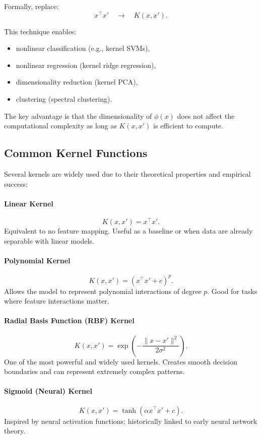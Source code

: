 \documentclass[12pt,a4paper]{report}
\begin{document}
Formally, replace:
\[
x^\top x' \quad \longrightarrow \quad K(x, x').
\]

This technique enables:
\begin{itemize}
  \item nonlinear classification (e.g., kernel SVMs),
  \item nonlinear regression (kernel ridge regression),
  \item dimensionality reduction (kernel PCA),
  \item clustering (spectral clustering).
\end{itemize}

The key advantage is that the dimensionality of $\phi(x)$ does not affect the computational complexity as long as $K(x, x')$ is efficient to compute.

\vspace{1em}
\subsection{Common Kernel Functions}

Several kernels are widely used due to their theoretical properties and empirical success:

\paragraph{Linear Kernel}
\[
K(x, x') = x^\top x'.
\]
Equivalent to no feature mapping. Useful as a baseline or when data are already separable with linear models.

\paragraph{Polynomial Kernel}
\[
K(x, x') = (x^\top x' + c)^p.
\]
Allows the model to represent polynomial interactions of degree $p$.  
Good for tasks where feature interactions matter.

\paragraph{Radial Basis Function (RBF) Kernel}
\[
K(x, x') = \exp\!\left( -\frac{\|x - x'\|^2}{2\sigma^2} \right).
\]
One of the most powerful and widely used kernels.  
Creates smooth decision boundaries and can represent extremely complex patterns.

\paragraph{Sigmoid (Neural) Kernel}
\[
K(x, x') = \tanh(\alpha x^\top x' + c).
\]
Inspired by neural activation functions; historically linked to early neural network theory.
\end{document}
